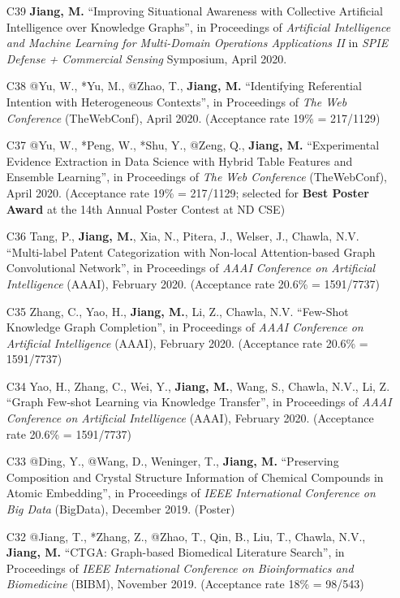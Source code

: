 \documentclass[10pt]{article}
\newenvironment{myindentpar}[1]%
{\begin{list}{}%
         {\setlength{\leftmargin}{#1}}%
         \item[]%
}
{\end{list}}
\newcounter{list}
\begin{document}
\begin{myindentpar}{0.00cm}
\begin{enumerate}[leftmargin=.5cm]
\item[C39] \textbf{Jiang, M.} ``Improving Situational Awareness with Collective Artificial Intelligence over Knowledge Graphs'', in Proceedings of \textit{Artificial Intelligence and Machine Learning for Multi-Domain Operations Applications II} in \textit{SPIE Defense + Commercial Sensing} Symposium, April 2020.

\item[C38] @Yu, W., *Yu, M., @Zhao, T., \textbf{Jiang, M.} ``Identifying Referential Intention with Heterogeneous Contexts'', in Proceedings of \textit{The Web Conference} (TheWebConf), April 2020. (Acceptance rate 19\% = 217/1129)

\item[C37] @Yu, W., *Peng, W., *Shu, Y., @Zeng, Q., \textbf{Jiang, M.} ``Experimental Evidence Extraction in Data Science with Hybrid Table Features and Ensemble Learning'', in Proceedings of \textit{The Web Conference} (TheWebConf), April 2020. (Acceptance rate 19\% = 217/1129; selected for \textbf{Best Poster Award} at the 14th Annual Poster Contest at ND CSE)

\item[C36] Tang, P., \textbf{Jiang, M.}, Xia, N., Pitera, J., Welser, J., Chawla, N.V. ``Multi-label Patent Categorization with Non-local Attention-based Graph Convolutional Network'', in Proceedings of \textit{AAAI Conference on Artificial Intelligence} (AAAI), February 2020. (Acceptance rate 20.6\% = 1591/7737)
	
\item[C35] Zhang, C., Yao, H., \textbf{Jiang, M.}, Li, Z., Chawla, N.V. ``Few-Shot Knowledge Graph Completion'', in Proceedings of \textit{AAAI Conference on Artificial Intelligence} (AAAI), February 2020. (Acceptance rate 20.6\% = 1591/7737)

\item[C34] Yao, H., Zhang, C., Wei, Y., \textbf{Jiang, M.}, Wang, S., Chawla, N.V., Li, Z. ``Graph Few-shot Learning via Knowledge Transfer'', in Proceedings of \textit{AAAI Conference on Artificial Intelligence} (AAAI), February 2020. (Acceptance rate 20.6\% = 1591/7737)

\item[C33] @Ding, Y., @Wang, D., Weninger, T., \textbf{Jiang, M.} ``Preserving Composition and Crystal Structure Information of Chemical Compounds in Atomic Embedding'', in Proceedings of \textit{IEEE International Conference on Big Data} (BigData), December 2019. (Poster)

\item[C32] @Jiang, T., *Zhang, Z., @Zhao, T., Qin, B., Liu, T., Chawla, N.V., \textbf{Jiang, M.} ``CTGA: Graph-based Biomedical Literature Search'', in Proceedings of \textit{IEEE International Conference on Bioinformatics and Biomedicine} (BIBM), November 2019. (Acceptance rate 18\% = 98/543)


\end{enumerate}
\end{myindentpar}
\end{document}
